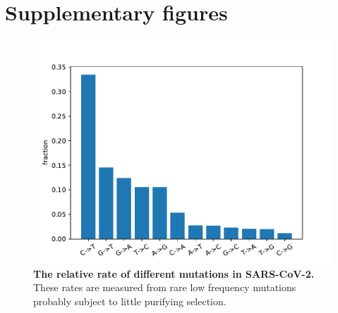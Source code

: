 \section*{Supplementary figures}

\begin{figure}
    \includegraphics[width=\textwidth]{figures/mutation_distribution.pdf}
    \caption{{\bf The relative rate of different mutations in SARS-CoV-2.}
    These rates are measured from rare low frequency mutations probably subject to little purifying selection.
    \label{fig:mutation_distribution}}
\end{figure}

